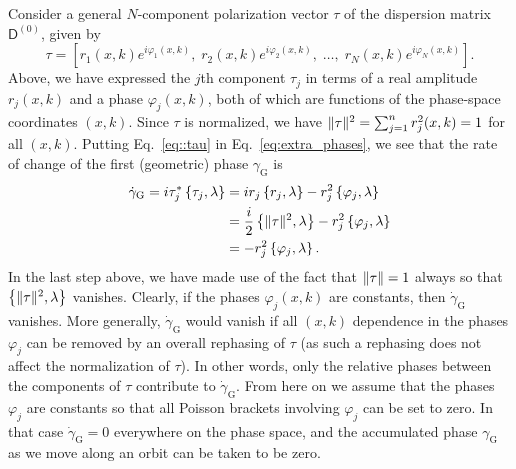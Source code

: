 Consider a general $N$-component polarization vector $\tau$ of the dispersion matrix $\mathsf{D}^{(0)}$, given by
%
\begin{equation}
  \tau =
  \left[
    r_{1}(x, k) e^{i{\varphi}_{1}(x,k)},\;
    r_{2}(x, k) e^{i{\varphi}_{2}(x, k)},\;
    \ldots,\;
    r_{N}(x, k) e^{i{\varphi}_{N}(x, k)}
  \right].
  \label{eq::tau}
\end{equation}
%
Above, we have expressed the $j$th component $\tau_{j}$ in terms of a real amplitude $r_{j}(x, k)$ and a phase $\varphi_{j}(x, k)$, both of which are functions of the phase-space coordinates $(x,k)$.
Since $\tau$ is normalized, we have $\lVert\tau\rVert^{2} = \sum_{j=1}^{n} r_{j}^{2}(x, k) = 1$ for all $(x, k)$.
Putting Eq.~\eqref{eq::tau} in Eq.~\eqref{eq:extra_phases}, we see that the rate of change of the first (geometric) phase $\gamma_{\text{G}}$ is
%
\begin{equation}
  \begin{aligned}
    \dot{\gamma}_{\text{G}} = i\tau^{*}_{j}\left\{\tau_{j}, \lambda\right\}
                  &= ir_{j}\left\{r_{j}, \lambda\right\} - r_{j}^{2}\left\{\varphi_{j}, \lambda\right\}\\
                 &= \frac{i}{2}\left\{\lVert\tau\rVert^{2}, \lambda\right\} - r_{j}^{2}\left\{\varphi_{j}, \lambda\right\}\\
                 &= -r_{j}^{2}\left\{\varphi_{j}, \lambda\right\}.
  \end{aligned}
\end{equation}
%
In the last step above, we have made use of the fact that $\lVert\tau\rVert = 1$ always so that $\left\{\lVert\tau\rVert^{2}, \lambda\right\}$ vanishes.
Clearly, if the phases $\varphi_{j}(x, k)$ are constants, then $\dot{\gamma}_{\text{G}}$ vanishes.
More generally, $\dot{\gamma}_{\text{G}}$ would vanish if all $(x, k)$ dependence in the phases $\varphi_{j}$ can be removed by an overall rephasing of $\tau$ (as such a rephasing does not affect the normalization of $\tau$).
In other words, only the relative phases between the components of $\tau$ contribute to $\dot{\gamma}_{\text{G}}$.
From here on we assume that the phases $\varphi_{j}$ are constants so that all Poisson brackets involving $\varphi_{j}$ can be set to zero.
In that case $\dot{\gamma}_{\text{G}} = 0$ everywhere on the phase space, and the accumulated phase $\gamma_{\text{G}}$ as we move along an orbit can be taken to be zero.

